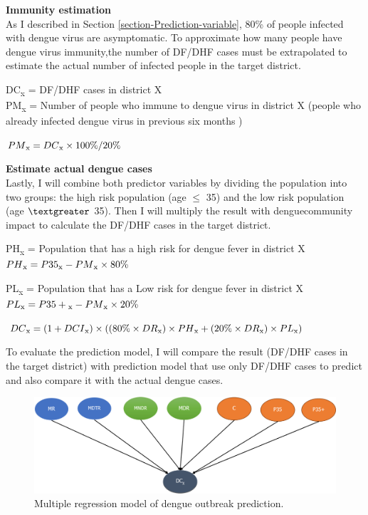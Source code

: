 \documentclass[review]{elsarticle}
\begin{document}
\textbf{Immunity estimation}\\
As I described in Section \ref{section-Prediction-variable}, 80\% of people infected with dengue virus are asymptomatic. To approximate how many people have dengue virus immunity,the number of DF/DHF cases must be extrapolated to estimate the actual number of infected people in the target district. 

DC\textsubscript{x} = DF/DHF cases in district X \\
PM\textsubscript{x} = Number of people who immune to dengue virus in district X (people who already infected dengue virus in previous six months )

$PM\textsubscript{x} = DC\textsubscript{x} \times 100\%/20\%$

\textbf{Estimate actual dengue cases}\\
Lastly, I will combine both predictor variables by dividing the population into two groups: the high risk population (age $\leqslant$ 35) and the low risk population (age $\textgreater$ 35). Then I will multiply the result with dengue\-community impact to calculate the DF/DHF cases in the target district.

PH\textsubscript{x} = Population that has a high risk for dengue fever in district X \\
$PH\textsubscript{x} = P35\textsubscript{x} - PM\textsubscript{x} \times 80\%$

PL\textsubscript{x} = Population that has a Low risk for dengue fever in district X \\
$PL\textsubscript{x} = P35+\textsubscript{x} - PM\textsubscript{x} \times 20\%$

$DC\textsubscript{x} = (1 + DCI\textsubscript{x}) \times ((80\% \times DR\textsubscript{x}) \times PH\textsubscript{x} + (20\% \times DR\textsubscript{x}) \times PL\textsubscript{x})$

To evaluate the prediction model, I will compare the result (DF/DHF cases in the target district) with prediction model that use only DF/DHF cases to predict and also compare it with the actual dengue cases. 


\begin{figure}[htbp]
	\begin{center}
		\includegraphics[width=120mm]{./figures/regression_dengue}
		\caption{Multiple regression model of dengue outbreak prediction.}
		\label{figure-regression_dengue}
	\end{center}
\end{figure}
\end{document}
